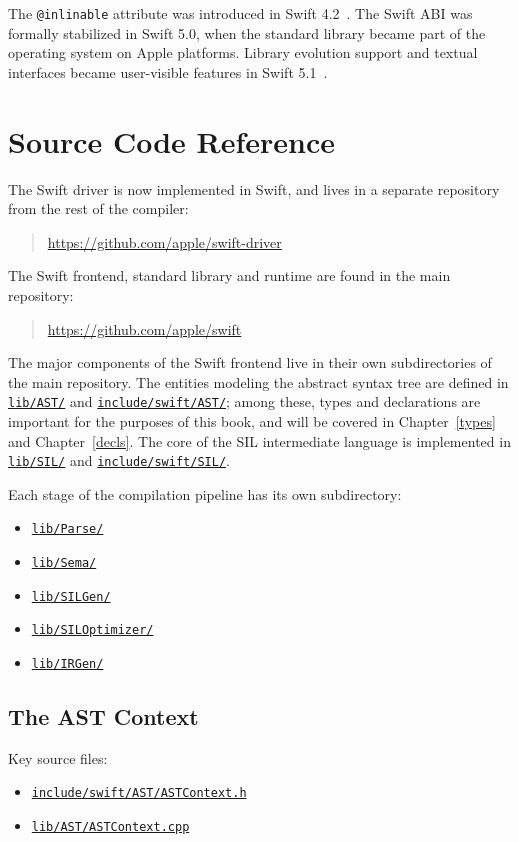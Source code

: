 \documentclass[a4paper,headsepline,bibliography=totoc,toc=flat,fleqn,twoside=semi]{scrbook}
\theoremstyle{definition}
\theoremstyle{definition}
\theoremstyle{definition}
\newcommand{\SourceFile}[1]{\href{https://github.com/apple/swift/tree/main/#1}{\texttt{#1}}}
\begin{document}
The \texttt{@inlinable} attribute was introduced in Swift 4.2~\cite{se0193}. The Swift ABI was formally stabilized in Swift 5.0, when the standard library became part of the operating system on Apple platforms. Library evolution support and textual interfaces became user-visible features in Swift 5.1~\cite{se0260}.

\section{Source Code Reference}\label{compilation model source reference}

The Swift driver is now implemented in Swift, and lives in a separate repository from the rest of the compiler:
\begin{quote}
\url{https://github.com/apple/swift-driver}
\end{quote}
The Swift frontend, standard library and runtime are found in the main repository:
\begin{quote}
\url{https://github.com/apple/swift}
\end{quote}
The major components of the Swift frontend live in their own subdirectories of the main repository. The entities modeling the abstract syntax tree are defined in \SourceFile{lib/AST/} and \SourceFile{include/swift/AST/}; among these, types and declarations are important for the purposes of this book, and will be covered in Chapter~\ref{types} and Chapter~\ref{decls}. The core of the SIL intermediate language is implemented in \SourceFile{lib/SIL/} and \SourceFile{include/swift/SIL/}.

Each stage of the compilation pipeline has its own subdirectory:
\begin{itemize}
\item \SourceFile{lib/Parse/}
\item \SourceFile{lib/Sema/}
\item \SourceFile{lib/SILGen/}
\item \SourceFile{lib/SILOptimizer/}
\item \SourceFile{lib/IRGen/}
\end{itemize}

\subsection*{The AST Context}
Key source files:
\begin{itemize}
\item \SourceFile{include/swift/AST/ASTContext.h}
\item \SourceFile{lib/AST/ASTContext.cpp}
\end{itemize}
\end{document}
